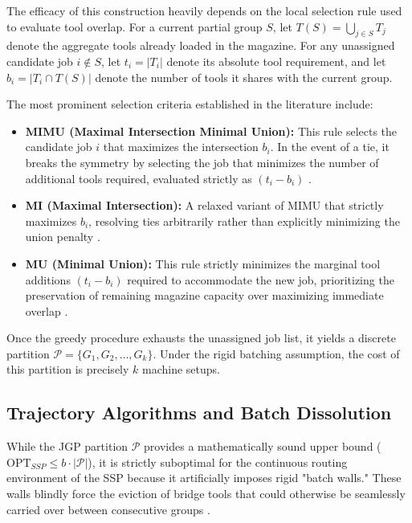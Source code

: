 \documentclass[11pt, a4paper]{book}
\begin{document}
	The efficacy of this construction heavily depends on the local selection rule used to evaluate tool overlap. For a current partial group $S$, let $T(S) = \bigcup_{j \in S} T_j$ denote the aggregate tools already loaded in the magazine. For any unassigned candidate job $i \notin S$, let $t_i = |T_i|$ denote its absolute tool requirement, and let $b_i = |T_i \cap T(S)|$ denote the number of tools it shares with the current group. 
	
	The most prominent selection criteria established in the literature include:
	\begin{itemize}
		\item \textbf{MIMU (Maximal Intersection Minimal Union):} This rule selects the candidate job $i$ that maximizes the intersection $b_i$. In the event of a tie, it breaks the symmetry by selecting the job that minimizes the number of additional tools required, evaluated strictly as $(t_i - b_i)$ %
		.
		\item \textbf{MI (Maximal Intersection):} A relaxed variant of MIMU that strictly maximizes $b_i$, resolving ties arbitrarily rather than explicitly minimizing the union penalty %
		.
		\item \textbf{MU (Minimal Union):} This rule strictly minimizes the marginal tool additions $(t_i - b_i)$ required to accommodate the new job, prioritizing the preservation of remaining magazine capacity over maximizing immediate overlap %
		.
	\end{itemize}
	
	Once the greedy procedure exhausts the unassigned job list, it yields a discrete partition $\mathcal{P} = \{G_1, G_2, \dots, G_k\}$. Under the rigid batching assumption, the cost of this partition is precisely $k$ machine setups. 
	
	\subsection{Trajectory Algorithms and Batch Dissolution}
	
	While the JGP partition $\mathcal{P}$ provides a mathematically sound upper bound ($\text{OPT}_{SSP} \le b \cdot |\mathcal{P}|$), it is strictly suboptimal for the continuous routing environment of the SSP because it artificially imposes rigid "batch walls." These walls blindly force the eviction of bridge tools that could otherwise be seamlessly carried over between consecutive groups %
	. 
	
\end{document}
